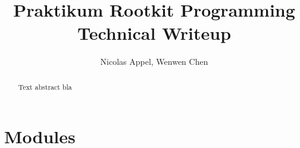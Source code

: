 \documentclass[DIV11,10pt]{scrreprt}
\title{Praktikum Rootkit Programming\\Technical Writeup}
\author{Nicolas Appel, Wenwen Chen}
\begin{document}
\maketitle
\begin{abstract}
Text abstract bla
\end{abstract}
\tableofcontents
\clearpage
\chapter{Modules}


\end{document}
